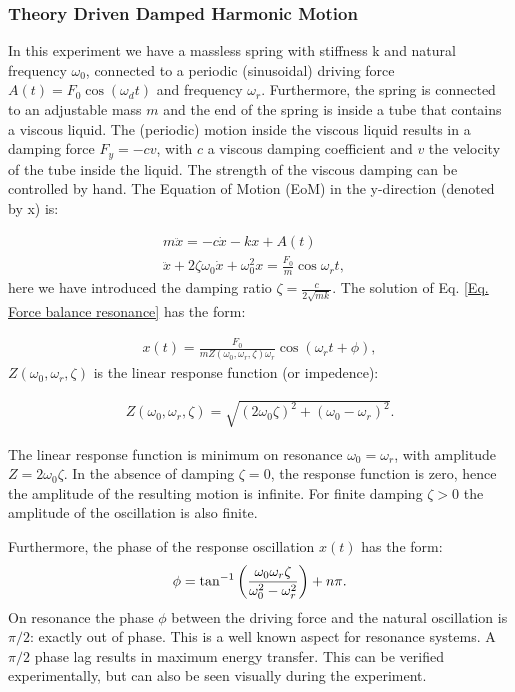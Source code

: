 \documentclass{article}
\begin{document}
\subsubsection{Theory Driven Damped Harmonic Motion}
In this experiment we have a massless spring with stiffness k and natural frequency $\omega_0$, connected to a periodic (sinusoidal) driving force $A(t) = F_0\cos(\omega_d t)$ and frequency $\omega_r$. Furthermore, the spring is connected to an adjustable mass $m$ and the end of the spring is inside a tube that contains a viscous liquid. The (periodic) motion inside the viscous liquid results in a damping force $F_y = -cv$, with $c$ a viscous damping coefficient and $v$ the velocity of the tube inside the liquid. The strength of the viscous damping can be controlled by hand. The Equation of Motion (EoM) in the y-direction (denoted by x) is:

\begin{align}
    m\ddot{x} = -c\dot{x} - kx + A(t) & \\
    \ddot{x} + 2\zeta\omega_0\dot{x} +\omega_0^2x = \frac{F_0}{m}\cos{\omega_r t},
    \label{Eq. Force balance resonance}
\end{align}
here we have introduced the damping ratio $\zeta = \frac{c}{2\sqrt{mk}}$. The solution of Eq. \ref{Eq. Force balance resonance} has the form:

\begin{align}
    x(t) = \frac{F_0}{m Z(\omega_0,\omega_r,\zeta) \omega_r}\cos(\omega_r t + \phi),
\end{align}
$Z(\omega_0,\omega_r,\zeta)$ is the linear response function (or impedence):

\begin{align}
    Z(\omega_0,\omega_r,\zeta) = \sqrt{(2\omega_0\zeta)^2 + (\omega_0-\omega_r)^2}.
\end{align}

The linear response function is minimum on resonance $\omega_0=\omega_r$, with amplitude $Z = 2\omega_0\zeta$. In the absence of damping $\zeta = 0$, the response function is zero, hence the amplitude of the resulting motion is infinite. For finite damping $\zeta > 0$ the amplitude of the oscillation is also finite.

Furthermore, the phase of the response oscillation $x(t)$ has the form: 
\begin{align}
    \phi = \tan^{-1}\bigg{(}\frac{\omega_0\omega_r\zeta}{\omega_0^2-\omega_r^2}\bigg{)} + n\pi.
\end{align}
On resonance the phase $\phi$ between the driving force and the natural oscillation is $\pi/2$: exactly out of phase. This is a well known aspect for resonance systems. A $\pi/2$ phase lag results in maximum energy transfer. This can be verified experimentally, but can also be seen visually during the experiment. 
\end{document}
